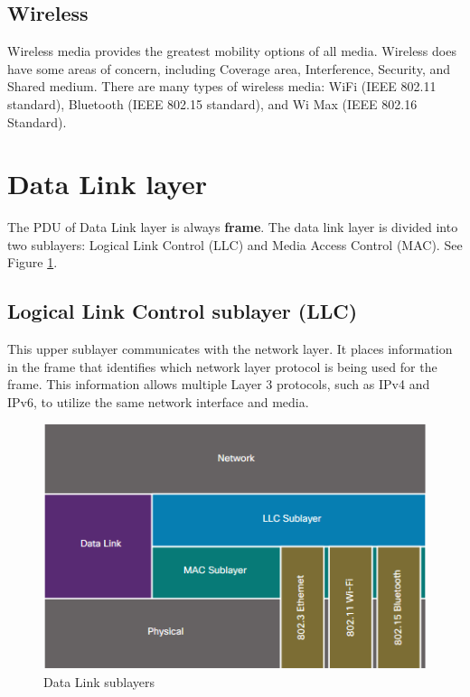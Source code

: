 \subsection{Wireless}

Wireless media provides the greatest mobility options of all media. Wireless does have some areas of concern, including Coverage area, Interference, Security, and Shared medium. There are many types of wireless media: WiFi (IEEE 802.11 standard), Bluetooth  (IEEE 802.15 standard), and Wi Max (IEEE 802.16 Standard).

\section{Data Link layer}

The PDU of Data Link layer is always \textbf{frame}. The data link layer is divided into two sublayers: Logical Link Control (LLC) and Media Access Control (MAC). See Figure \ref{Sublayers}.

\subsection{Logical Link Control sublayer (LLC)}

This upper sublayer communicates with the network layer. It places information in the frame that identifies which network layer protocol is being used for the frame. This information allows multiple Layer 3 protocols, such as IPv4 and IPv6, to utilize the same network interface and media.

\begin{figure}[hbtp]
\caption{Data Link sublayers}\label{Sublayers}
\centering
\includegraphics[scale=0.7]{pictures/Sublayers.PNG}
\end{figure}

